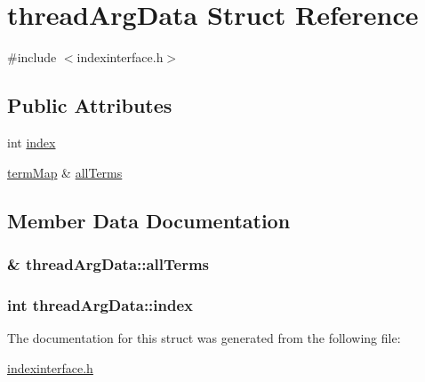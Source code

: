 \hypertarget{structthread_arg_data}{}\section{thread\+Arg\+Data Struct Reference}
\label{structthread_arg_data}


{\ttfamily \#include $<$indexinterface.\+h$>$}

\subsection*{Public Attributes}
\begin{DoxyCompactItemize}
\item 
int \hyperlink{structthread_arg_data_a4e6f861158b648e1879aa43da7516102}{index}
\item 
\hyperlink{docparser_8h_a9b942645c404d380838be4078b0199d9}{term\+Map} \& \hyperlink{structthread_arg_data_a2172136d6a60921ea13a6b0ceefd0585}{all\+Terms}
\end{DoxyCompactItemize}


\subsection{Member Data Documentation}
\hypertarget{structthread_arg_data_a2172136d6a60921ea13a6b0ceefd0585}{}
\subsubsection[{all\+Terms}]{\& thread\+Arg\+Data\+::all\+Terms}\label{structthread_arg_data_a2172136d6a60921ea13a6b0ceefd0585}
\hypertarget{structthread_arg_data_a4e6f861158b648e1879aa43da7516102}{}
\subsubsection[{index}]{\setlength{\rightskip}{0pt plus 5cm}int thread\+Arg\+Data\+::index}\label{structthread_arg_data_a4e6f861158b648e1879aa43da7516102}


The documentation for this struct was generated from the following file\+:\begin{DoxyCompactItemize}
\item 
\hyperlink{indexinterface_8h}{indexinterface.\+h}\end{DoxyCompactItemize}
